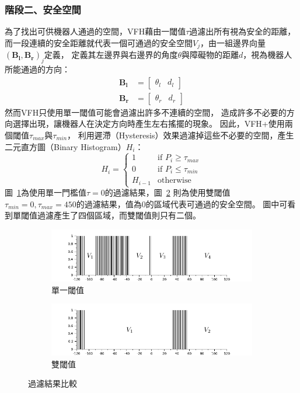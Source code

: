 \subsubsection{階段二、安全空間}
為了找出可供機器人通過的空間，VFH藉由一閾值$\tau$過濾出所有視為安全的距離，
而一段連續的安全距離就代表一個可通過的安全空間$V_j$，由一組邊界向量$(\mathbf{B_l},\mathbf{B_r})_j$定義，
定義其左邊界與右邊界的角度$\theta$與障礙物的距離$d$，視為機器人所能通過的方向：
\begin{align}
	\mathbf{B_l}	&= \begin{bmatrix}
				\theta_l & d_l
			   \end{bmatrix} \nonumber \\
	\mathbf{B_r}	&= \begin{bmatrix}
				\theta_r & d_r
			   \end{bmatrix}
	\label{e:boundary}
\end{align}
然而VFH只使用單一閾值可能會過濾出許多不連續的空間，
造成許多不必要的方向選擇出現，讓機器人在決定方向時產生左右搖擺的現象。
因此，VFH+使用兩個閾值$\tau_{max}$與$\tau_{min}$，
利用遲滯（Hysteresis）效果過濾掉這些不必要的空間，產生二元直方圖（Binary Histogram）$H_i$：
\begin{equation}
	H_i = 
	\begin{cases}
		1	& \textrm{if } P_i \geq \tau_{max} \\
		0	& \textrm{if } P_i \leq \tau_{min} \\
		H_{i-1}	& \textrm{otherwise}
	\end{cases}
\end{equation}
圖~\ref{f:binary_histogram_1}為使用單一門檻值$\tau=0$的過濾結果，圖~\ref{f:binary_histogram_2}
則為使用雙閾值$\tau_{min}=0,\tau_{max}=450$的過濾結果，值為$0$的區域代表可通過的安全空間。
圖中可看到單閾值過濾產生了四個區域，而雙閾值則只有二個。
\begin{figure}[h!]
	\centering
	\begin{subfigure}[b]{0.8\textwidth}
		\includegraphics[width=\textwidth]{figures/binary_histogram_1}
		\caption{單一閾值}
		\label{f:binary_histogram_1}
	\end{subfigure}
	\begin{subfigure}[b]{0.8\textwidth}
		\includegraphics[width=\textwidth]{figures/binary_histogram_2}
		\caption{雙閾值}
		\label{f:binary_histogram_2}
	\end{subfigure}
	\caption{過濾結果比較}
	\label{f:binary_histogram}
\end{figure}


